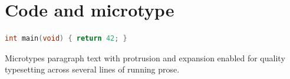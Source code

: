 \documentclass{article}
\begin{document}
\section{Code and microtype}
\begin{lstlisting}[language=C,caption={Sample C function}]
int main(void) { return 42; }
\end{lstlisting}
Microtypes paragraph text with protrusion and expansion enabled for
quality typesetting across several lines of running prose.
\end{document}
